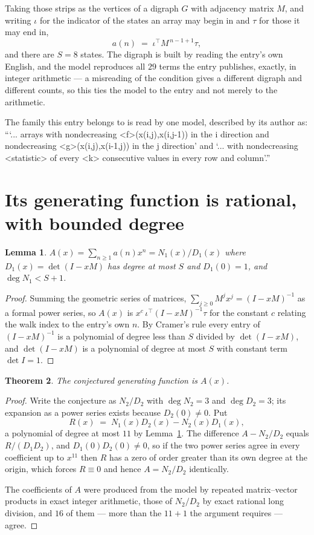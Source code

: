 \documentclass[11pt,a4paper]{article}
\theoremstyle{plain}
\newtheorem{theorem}{Theorem}
\newtheorem{lemma}[theorem]{Lemma}
\theoremstyle{definition}
\begin{document}
Taking those strips as the vertices of a digraph $G$ with adjacency matrix $M$, and writing
$\iota$ for the indicator of the states an array may begin in and $\tau$ for those it may end
in,
\[
a(n)\;=\;\iota^{\!\top}M^{\,n-1+1}\tau ,
\]
and there are $S=8$ states. The digraph is built by reading the entry's own English, and the
model reproduces all $29$ terms the entry publishes, exactly, in integer arithmetic --- a
misreading of the condition gives a different digraph and different counts, so this ties the
model to the entry and not merely to the arithmetic.

The family this entry belongs to is read by one model, described by its author as: ```... arrays with nondecreasing <f>(x(i,j),x(i,j-1)) in the i direction and nondecreasing <g>(x(i,j),x(i-1,j)) in the j direction' and `... with nondecreasing <statistic> of every <k> consecutive values in every row and column'.''


\section{Its generating function is rational, with bounded degree}

\begin{lemma}\label{lem:rat}
$A(x)=\sum_{n\ge1}a(n)x^n=N_1(x)/D_1(x)$ where $D_1(x)=\det(I-xM)$ has degree at most
$S$ and $D_1(0)=1$, and $\deg N_1<S+1$.
\end{lemma}

\begin{proof}
Summing the geometric series of matrices, $\sum_{j\ge0}M^jx^j=(I-xM)^{-1}$ as a formal
power series, so $A(x)$ is $x^{c}\,\iota^{\!\top}(I-xM)^{-1}\tau$ for the constant $c$
relating the walk index to the entry's own $n$. By Cramer's rule every entry of
$(I-xM)^{-1}$ is a polynomial of degree less than $S$ divided by $\det(I-xM)$, and
$\det(I-xM)$ is a polynomial of degree at most $S$ with constant term $\det I=1$.
\end{proof}

\begin{theorem}
The conjectured generating function is $A(x)$.
\end{theorem}

\begin{proof}
Write the conjecture as $N_2/D_2$ with $\deg N_2=3$ and $\deg D_2=3$; its expansion as a
power series exists because $D_2(0)\neq0$. Put
\[
R(x)\;=\;N_1(x)D_2(x)-N_2(x)D_1(x),
\]
a polynomial of degree at most $11$ by Lemma~\ref{lem:rat}. The difference
$A-N_2/D_2$ equals $R/(D_1D_2)$, and $D_1(0)D_2(0)\neq0$, so if the two power series agree in
every coefficient up to $x^{11}$ then $R$ has a zero of order greater than its own
degree at the origin, which forces $R\equiv0$ and hence $A=N_2/D_2$ identically.

The coefficients of $A$ were produced from the model by repeated matrix--vector products in
exact integer arithmetic, those of $N_2/D_2$ by exact rational long division, and $16$
of them --- more than the $11+1$ the argument requires --- agree.
\end{proof}
\end{document}
